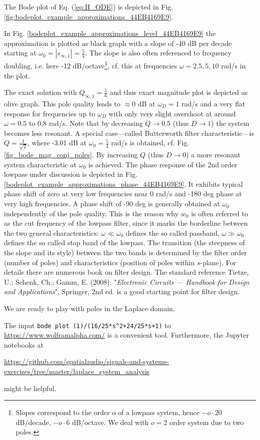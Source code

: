 \documentclass[11pt,a4paper,DIV=12]{scrartcl}
\numberwithin{equation}{section}
\numberwithin{figure}{section}
\newcommand{\eq}[1]{Eq. (\ref{#1})} %
\newcommand{\fig}[1]{Fig. \ref{#1}} %
\begin{document}
\begin{Loesung}
The Bode plot of \eq{eq:H_ODE} is depicted in
\fig{fig:bodeplot_example_approximations_44EB4169E9}.


%
In \fig{bodeplot_example_approximations_level_44EB4169E9} the approximation is plotted as
black graph with a slope of -40 dB per decade starting at
$\omega_0 = |s_{\infty,1}|=\frac{5}{4}$.
The slope is also often referenced to frequency doubling, i.e. here
-12 dB/octave\footnote{Slopes correspond to the order $o$ of a lowpass system,
hence $-o\cdot 20$ dB/decade, $-o\cdot 6$ dB/octave.
We deal with $o=2$ order system due to two poles.},
cf. this at frequencies $\omega=2.5, 5, 10$ rad/s in the plot.

The exact solution with $Q_{\infty,1}=\frac{5}{6}$ and thus exact magnitude plot
is depicted as olive graph. This pole quality leads to $\approx 0$ dB at
$\omega_D=1$ rad/s and a very flat response for frequencies up to $\omega_D$
with only very slight overshoot at around $\omega = 0.5$ to $0.8$ rad/s.
Note that by decreasing $Q\rightarrow 0.5$ (thus $D\rightarrow 1$)
the system becomes less resonant.
A special case---called Butterworth filter characteristic---is
$Q = \frac{1}{\sqrt{2}}$, where -3.01 dB at $\omega_0 = \frac{5}{4}$ rad/s is
obtained, cf. Fig. \ref{fig_bode_mag_conj_poles}.
By increasing $Q$ (thus $D\rightarrow 0$) a more resonant system characteristic at $\omega_0$ is achieved.
%
The phase response of the 2nd order lowpass under discussion is depicted
in \fig{bodeplot_example_approximations_phase_44EB4169E9}.
It exhibits typical phase shift of zero at very low frequencies near 0 rad/s and -180 deg phase at very high frequencies.
A phase shift of -90 deg is generally obtained at $\omega_0$ independently of
the pole quality.
This is the reason why $w_0$ is often referred to as the cut frequency
of the lowpass filter, since it marks the borderline between the two general
characteristics: $\omega \ll \omega_0$ defines the so called passband,
$\omega \gg \omega_0$ defines the so called stop band of the lowpass.
The transition
(the steepness of the slope and its style) between the two bands is
determined by the filter order (number of poles) and characteristics (position of poles within $s$-plane).
For details there are numerous book on filter design. The standard reference Tietze, U.; Schenk, Ch.; Gamm, E. (2008): "\textit{Electronic Circuits --- Handbook for Design and Applications}", Springer, 2nd ed. is a good starting point for filter design.

We are ready to play with poles in the Laplace domain.

The
input \verb|bode plot (1)/(16/25*s^2+24/25*s+1)|
to
\url{https://www.wolframalpha.com/}
is a convenient tool. Furthermore, the Jupyter notebooks
at

\url{https://github.com/spatialaudio/signals-and-systems-exercises/tree/master/laplace_system_analysis}

might be helpful.
\end{Loesung}
\end{document}
